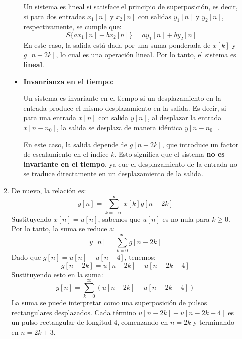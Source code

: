 \begin{enumerate}[label=\color{red}\textbf{\arabic*)}]
\begin{enumerate}[label=\color{red}\textbf{\alph*)}]
\begin{itemize}[label=\textbullet]
            Un sistema es lineal si satisface el principio de superposición, es decir, si para dos entradas $x_1[n]$ y $x_2[n]$ con salidas $y_1[n]$ y $y_2[n]$, respectivamente, se cumple que: \[
              S \{ax_1[n]+bx_2[n]\} =ay_1[n]+by_2[n]
            \] 
            En este caso, la salida está dada por una suma ponderada de $x[k]$ y  $g[n-2k]$, lo cual es una operación lineal. Por lo tanto, el sistema es  \textbf{lineal}.
          \item \textbf{Invanrianza en el tiempo:}

            Un sistema es invariante en el tiempo si un desplazamiento en la entrada produce el mismo desplazamiento en la salida. Es decir, si para una entrada $x[n]$ con salida  $y[n]$, al desplazar la entrada  $x[n-n_0]$, la salida se desplaza de manera idéntica $y[n-n_0]$.

            En este caso, la salida depende de $g[n-2k]$, que introduce un factor de escalamiento en el índice  $k$. Esto significa que el sistema  \textbf{no es invariante en el tiempo}, ya que el desplazamiento de la entrada no se traduce directamente en un desplazamiento de la salida. 
        \end{itemize}
      \item {} 

        De nuevo, la relación es: \[
          y[n]=\sum_{k=-\infty}^{\infty} x[k]g[n-2k]
        \] 
        Sustituyendo $x[n]=u[n]$, sabemos que  $u[n]$ es no nula para  $k\ge 0$. Por lo tanto, la suma se reduce a: \[
          y[n]=\sum_{k=0}^{\infty} g[n-2k]
        \] 
        Dado que $g[n]=u[n]-u[n-4]$, tenemos:  \[
          g[n-2k]=u[n-2k]-u[n-2k-4]
        \] 
        Sustituyendo esto en la suma: \[
          y[n]=\sum_{k=0}^{\infty} (u[n-2k]-u[n-2k-4])
        \] 
        La suma se puede interpretar como una superposición de pulsos rectangulares desplazados. Cada término $u[n-2k]-u[n-2k-4]$ es un pulso rectangular de longitud 4, comenzando en  $n=2k$ y terminando en  $n=2k+3$.


\end{enumerate}
\end{enumerate}
